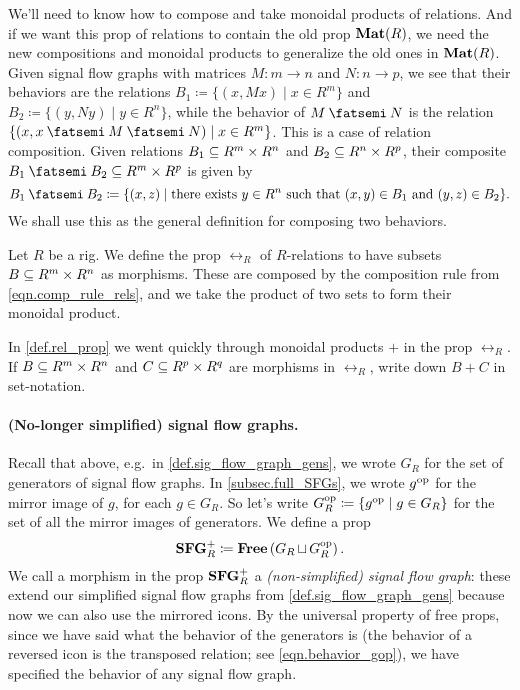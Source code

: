 \documentclass[7Sketches]{subfiles}
\begin{document}
We'll need to know how to compose and take monoidal products of relations. And if we want this prop of relations to contain the old prop $\mat(R)$, we need the new compositions and monoidal products to generalize the old ones in $\mat(R)$. Given signal flow graphs with matrices $M\colon m \to n$ and $N\colon n
\to p$, we see that their behaviors are the relations $B_1\coloneq\{(x,Mx) \mid x \in R^m\}$ and
$B_2\coloneq\{(y,Ny) \mid y \in R^n\}$, while the behavior of $M\cp N$ is the relation
$\{(x,x\cp M\cp N) \mid x \in R^m\}$. This is a case of relation composition. Given relations $B_1\ss R^m\times R^n$ and $B_2\ss R^n\times R^p$, their composite $B_1\cp B_2\ss R^m\times R^p$ is given by
\begin{equation}%
\label{eqn.comp_rule_rels}%
\index{relations!composition of}
  B_1\cp B_2\coloneqq
  \{(x,z)\mid \textrm{there exists } y \in R^n\textrm{ such that } (x,y) \in
  B_1\text{ and } (y,z) \in B_2\}.
\end{equation}
We shall use this as the general definition for composing two behaviors. 

\begin{definition}%
\label{def.rel_prop}%
Let $R$ be a rig. We define the prop $\rel_R$ of $R$-relations to have subsets
$B\ss R^m \times R^n$ as morphisms. These are composed by the composition
rule from \cref{eqn.comp_rule_rels}, and we take the product of two sets to form their monoidal product.
\end{definition}

\begin{exercise}%
\label{exc.monoidal_prod_+}
In \cref{def.rel_prop} we went quickly through monoidal products $+$ in the prop $\rel_R$. If $B\ss R^m\times R^n$ and $C\ss R^p\times R^q$ are morphisms in $\rel_R$, write down $B+C$ in set-notation.
\end{exercise}

\paragraph{(No-longer simplified) signal flow graphs.}
Recall that above, e.g.\ in \cref{def.sig_flow_graph_gens}, we wrote $G_R$ for the set of generators of signal flow graphs. In \cref{subsec.full_SFGs}, we wrote $g\op$ for the mirror image of $g$, for each $g\in G_R$. So let's write $G_R\op\coloneqq\{g\op\mid g\in G_R\}$ for the set of all the mirror images of generators.  We define a prop
\begin{equation}%
\label{eqn.SFG_plus}
	\sfg_R^+\coloneqq \free\left(G_R\dju G_R\op\right).
\end{equation}
We call a morphism in the prop $\sfg_R^+$ a \emph{(non-simplified) signal flow
graph}: these extend our simplified signal flow graphs from
\cref{def.sig_flow_graph_gens} because now we can also use the mirrored icons.
By the universal property of free props, since we have said what the behavior of
the generators is (the behavior of a reversed icon is the transposed relation; see \cref{eqn.behavior_gop}), we have specified the behavior of any signal flow graph.
%
\end{document}
